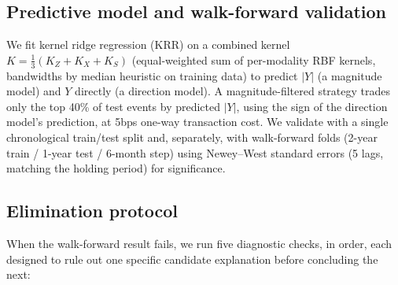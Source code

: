\documentclass[11pt]{article}
\begin{document}
\subsection{Predictive model and walk-forward validation}

We fit kernel ridge regression (KRR) on a combined kernel $K = \tfrac{1}{3}(K_Z + K_X + K_S)$ (equal-weighted sum of per-modality RBF kernels, bandwidths by median heuristic on training data) to predict $|Y|$ (a magnitude model) and $Y$ directly (a direction model). A magnitude-filtered strategy trades only the top 40\% of test events by predicted $|Y|$, using the sign of the direction model's prediction, at 5bps one-way transaction cost. We validate with a single chronological train/test split and, separately, with walk-forward folds (2-year train / 1-year test / 6-month step) using Newey--West standard errors (5 lags, matching the holding period) for significance.

\subsection{Elimination protocol}
\label{sec:elimination}

When the walk-forward result fails, we run five diagnostic checks, in order, each designed to rule out one specific candidate explanation before concluding the next:
\end{document}
